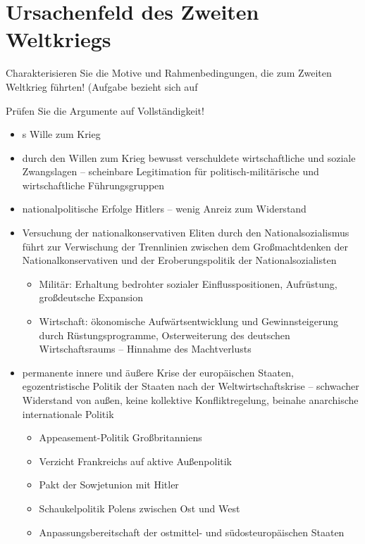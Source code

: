 \section{Ursachenfeld des Zweiten Weltkriegs}

\begin{aufgabe}
Charakterisieren Sie die Motive und Rahmenbedingungen, die zum Zweiten
Weltkrieg führten! (Aufgabe bezieht sich auf \cite[47
oben]{IzpBNatsoz2}

Prüfen Sie die Argumente auf Vollständigkeit! 
\end{aufgabe}

\begin{itemize}
\item {}s Wille zum Krieg

\item durch den Willen zum Krieg bewusst verschuldete wirtschaftliche
und soziale Zwangslagen -- scheinbare Legitimation für
politisch-militärische und wirtschaftliche Führungsgruppen

\item nationalpolitische Erfolge Hitlers -- wenig Anreiz zum
Widerstand

\item Versuchung der nationalkonservativen Eliten durch den
Nationalsozialismus führt zur Verwischung der Trennlinien zwischen dem
Großmachtdenken der Nationalkonservativen und der Eroberungspolitik
der Nationalsozialisten
\begin{itemize}
\item Militär: Erhaltung bedrohter sozialer Einflusspositionen,
Aufrüstung, großdeutsche Expansion
\item Wirtschaft: ökonomische Aufwärtsentwicklung und Gewinnsteigerung
durch Rüstungsprogramme, Osterweiterung des deutschen Wirtschaftsraums
-- Hinnahme des Machtverlusts
\end{itemize}

\item permanente innere und äußere Krise der europäischen Staaten,
egozentristische Politik der Staaten nach der Weltwirtschaftskrise --
schwacher Widerstand von außen, keine kollektive Konfliktregelung,
beinahe anarchische internationale Politik
\begin{itemize}
\item Appeasement-Politik Großbritanniens
\item Verzicht Frankreichs auf aktive Außenpolitik
\item Pakt der Sowjetunion mit Hitler
\item Schaukelpolitik Polens zwischen Ost und West
\item Anpassungsbereitschaft der ostmittel- und südosteuropäischen
Staaten 
\end{itemize}


\end{itemize}
